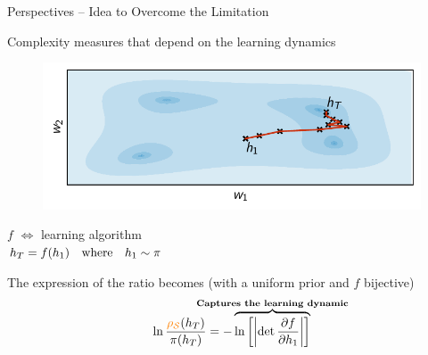 \documentclass{slides}
\begin{document}
\begin{xframe}{Perspectives -- {\small Idea to Overcome the Limitation}}

\vspace{-0.3cm}

\begin{xblock}{}
 Complexity measures that depend on the learning dynamics 
\end{xblock}

\begin{minipage}{0.6\linewidth}
  \begin{figure}
      \centering
      \includegraphics[width=1.0\linewidth]{figures/perspectives_algo.pdf}
  \end{figure}
\end{minipage}
\hfill
\begin{minipage}{0.35\linewidth}
$f$ $\iff$ learning algorithm\\[0.3cm]
$\textcolor{black}{h}_T = f(\textcolor{black}{h}_1) \quad\text{where}\quad \textcolor{black}{h}_1\sim\pi$
\end{minipage}
  
  \begin{xblock}{}
      The expression of the ratio becomes {\scriptsize (with a uniform prior and $f$ bijective)}
      \begin{align*}
      \ln\frac{\AQ(\h_T)}{\P(\h_T)} = -\overbrace{\ln\LB\LN\det \frac{\partial f}{\partial \h_1}\RN\RB}^{\mathclap{\text{\bf Captures the learning dynamic}}}
      \end{align*}
  \end{xblock}
\end{xframe}


\appendix
\end{document}
